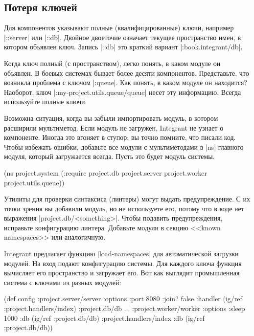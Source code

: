 \subsection{Потеря ключей}

Для компонентов указывают полные (квалифицированные) ключи, например
\spverb|::server| или \spverb|::db|. Двойное двоеточие означает текущее
пространство имен, в котором объявлен ключ. Запись \spverb|::db| это краткий
вариант \spverb|:book.integrant/db|.

Когда ключ полный (с пространством), легко понять, в каком модуле он объявлен. В
боевых системах бывает более десяти компонентов. Представьте, что возникла
проблема с ключом \spverb|:queue|. Как понять, в каком модуле он находится?
Наоборот, ключ \spverb|:my-project.utils.queue/queue| несет эту
информацию. Всегда используйте полные ключи.

Возможна ситуация, когда вы забыли импортировать модуль, в котором расширили
мультиметод. Если модуль не загружен, Integrant не узнает о компоненте. Иногда
это вгоняет в ступор: вы точно помните, что писали код. Чтобы избежать ошибки,
добавьте все модули с мультиметодами в \spverb|ns| главного модуля, который
загружается всегда. Пусть это будет модуль системы.

\begin{english}
  \begin{clojure}
(ns project.system
  (:require project.db
            project.server
            project.worker
            project.utils.queue))
  \end{clojure}
\end{english}

Утилиты для проверки синтаксиса (линтеры) могут выдать предупреждение. С их
точки зрения вы добавили модуль, но не используете его, потому что в коде нет
выражения \spverb|project.db/<something>|. Чтобы подавить предупреждения,
исправьте конфигурацию линтера. Добавьте модули в секцию <<known namespaces>>
или аналогичную.

Integrant предлагает функцию \spverb|load-namespaces| для автоматической
загрузки модулей. На вход подают конфигурацию системы. Для каждого ключа функция
вычисляет его пространство и загружает его. Вот как выглядит промышленная
система с ключами из разных модулей:

\begin{english}
  \begin{clojure}
(def config
  {:project.server/server
   {:options {:port 8080 :join? false}
    :handler (ig/ref :project.handlers/index)}
   :project.db/db {...}
   :project.worker/worker
   {:options {:sleep 1000}
    :db      (ig/ref :project.db/db)}
   :project.handlers/index
   {:db (ig/ref :project.db/db)}})
  \end{clojure}
\end{english}

